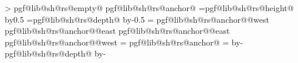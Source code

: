 {{            \pgfextract@process{}%
            \addtosavedmacro\southwest%
            \pgfextract@process{}%
            \addtosavedmacro\centerpoint%
            \pgfmathloop%
                \ifnum\pgfmathcounter>\parts%
                \else%
                    \pgf@lib@sh@getalpha\pgf@lib@sh@rs@number{\pgfmathcounter}%
                    \expandafter\ifx\csname pgf@lib@sh@rs@empty@\pgf@lib@sh@rs@number\endcsname\pgfutil@empty%
                    \else%
                        \csname pgf@lib@sh@rs@anchor@\pgf@lib@sh@rs@number\endcsname%
                        \pgf@ya=\csname pgf@lib@sh@rs@height@\pgf@lib@sh@rs@number\endcsname\relax%
                        \advance\pgf@y by0.5\pgf@ya%
                        \pgf@ya=\csname pgf@lib@sh@rs@depth@\pgf@lib@sh@rs@number\endcsname\relax%
                        \advance\pgf@y by-0.5\pgf@ya%
                        \pgf@ya=\pgf@y%
                        \expandafter\pgfextract@process\csname pgf@lib@sh@rs@anchor@\pgf@lib@sh@rs@number @west\endcsname{%
                            \southwest%
                            \pgf@y=\pgf@ya%
                        }%
                        \expandafter\pgfextract@process\csname pgf@lib@sh@rs@anchor@\pgf@lib@sh@rs@number @east\endcsname{%
                            \northeast%
                            \pgf@y=\pgf@ya%
                        }%
                        \expandafter\addtosavedmacro\csname pgf@lib@sh@rs@anchor@\pgf@lib@sh@rs@number @east\endcsname%
                        \expandafter\addtosavedmacro\csname pgf@lib@sh@rs@anchor@\pgf@lib@sh@rs@number @west\endcsname%
                        \ifnum\pgfmathcounter=\parts%
                        \else%
                            \csname pgf@lib@sh@rs@anchor@\pgf@lib@sh@rs@number\endcsname%
                            \pgf@ya=\pgf@y%
                            \advance\pgf@ya by-\csname pgf@lib@sh@rs@depth@\pgf@lib@sh@rs@number\endcsname\relax%
                            \advance\pgf@ya by-\innerysep\relax%
}}
